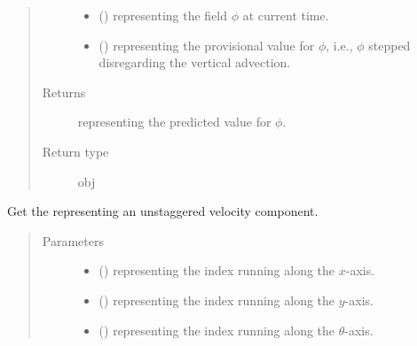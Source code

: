\documentclass[letterpaper,10pt,english]{sphinxmanual}
\begin{document}
\begin{fulllineitems}
\begin{fulllineitems}
\begin{quote}
\begin{description}
\begin{itemize}
\item {} 
 () \textendash{}  representing the field \(\phi\) at current time.

\item {} 
 () \textendash{}  representing the provisional value for \(\phi\), i.e., \(\phi\) stepped
disregarding the vertical advection.

\end{itemize}

\item[{Returns}] \leavevmode
{} representing the predicted value for \(\phi\).

\item[{Return type}] \leavevmode
obj

\end{description}\end{quote}

\end{fulllineitems}


\begin{fulllineitems}
\label{\detokenize{api:dycore.flux_isentropic_maccormack.FluxIsentropicMacCormack._get_velocity}}
Get the  representing an unstaggered velocity component.
\begin{quote}\begin{description}
\item[{Parameters}] \leavevmode\begin{itemize}
\item {} 
 () \textendash{}  representing the index running along the \(x\)-axis.

\item {} 
 () \textendash{}  representing the index running along the \(y\)-axis.

\item {} 
 () \textendash{}  representing the index running along the \(\theta\)-axis.


\end{itemize}
\end{description}
\end{quote}
\end{fulllineitems}
\end{fulllineitems}
\end{document}
